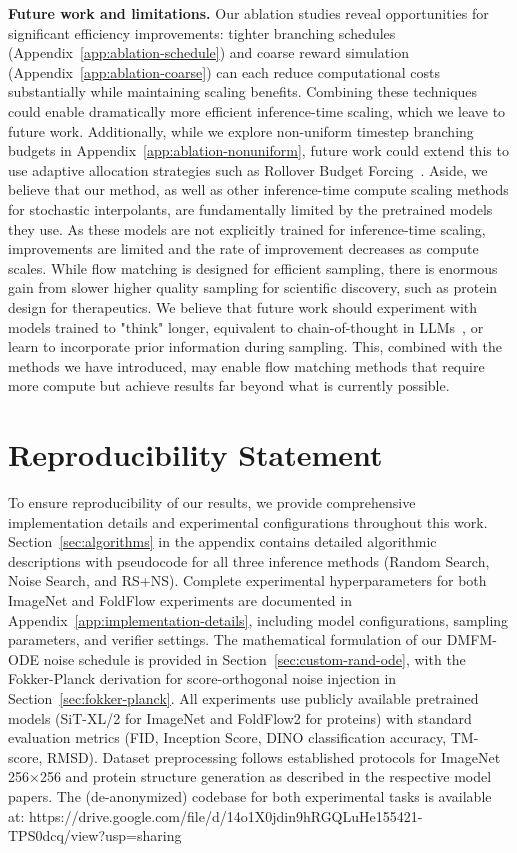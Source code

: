 \documentclass{article} %
\newcommand{\rev}[1]{{\color{blue}#1}}
\begin{document}
\textbf{Future work and limitations.} \rev{Our ablation studies reveal opportunities for significant efficiency improvements: tighter branching schedules (Appendix~\ref{app:ablation-schedule}) and coarse reward simulation (Appendix~\ref{app:ablation-coarse}) can each reduce computational costs substantially while maintaining scaling benefits. Combining these techniques could enable dramatically more efficient inference-time scaling, which we leave to future work. Additionally, while we explore non-uniform timestep branching budgets in Appendix~\ref{app:ablation-nonuniform}, future work could extend this to use adaptive allocation strategies such as Rollover Budget Forcing~\cite{kim2025flowits}}. Aside, we believe that our method, as well as other inference-time compute scaling methods for stochastic interpolants, are fundamentally limited by the pretrained models they use. As these models are not explicitly trained for inference-time scaling, improvements are limited and the rate of improvement decreases as compute scales. While flow matching is designed for efficient sampling, there is enormous gain from slower higher quality sampling for scientific discovery, such as protein design for therapeutics. We believe that future work should experiment with models trained to "think" longer, equivalent to chain-of-thought in LLMs~\cite{openai2024o1}, or learn to incorporate prior information during sampling. This, combined with the methods we have introduced, may enable flow matching methods that require more compute but achieve results far beyond what is currently possible.

\section*{Reproducibility Statement}
To ensure reproducibility of our results, we provide comprehensive implementation details and experimental configurations throughout this work. Section~\ref{sec:algorithms} in the appendix contains detailed algorithmic descriptions with pseudocode for all three inference methods (Random Search, Noise Search, and RS+NS). Complete experimental hyperparameters for both ImageNet and FoldFlow experiments are documented in Appendix~\ref{app:implementation-details}, including model configurations, sampling parameters, and verifier settings. The mathematical formulation of our DMFM-ODE noise schedule is provided in Section~\ref{sec:custom-rand-ode}, with \rev{the Fokker-Planck derivation for score-orthogonal noise injection in Section~\ref{sec:fokker-planck}}. All experiments use publicly available pretrained models (SiT-XL/2 for ImageNet and FoldFlow2 for proteins) with standard evaluation metrics (FID, Inception Score, DINO classification accuracy, TM-score, RMSD). Dataset preprocessing follows established protocols for ImageNet 256×256 and protein structure generation as described in the respective model papers. The (de-anonymized) codebase for both experimental tasks is available at: https://drive.google.com/file/d/14o1X0jdin9hRGQLuHe155421-TPS0dcq/view?usp=sharing
\end{document}
